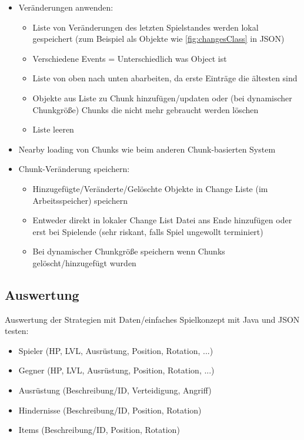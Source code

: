 \begin{itemize}
    \item Veränderungen anwenden:
    \begin{itemize}
        \item Liste von Veränderungen des letzten Spielstandes werden lokal gespeichert (zum Beispiel als Objekte wie \ref{fig:changesClass} in JSON)
        \item Verschiedene Events = Unterschiedlich was Object ist
        \item Liste von oben nach unten abarbeiten, da erste Einträge die ältesten sind 
        \item Objekte aus Liste zu Chunk hinzufügen/updaten oder (bei dynamischer Chunkgröße) Chunks die nicht mehr gebraucht werden löschen
        \item Liste leeren
    \end{itemize}
    \item Nearby loading von Chunks wie beim anderen Chunk-basierten System
    \item Chunk-Veränderung speichern:
    \begin{itemize}
        \item Hinzugefügte/Veränderte/Gelöschte Objekte in Change Liste (im Arbeitsspeicher) speichern
        \item Entweder direkt in lokaler Change List Datei ans Ende hinzufügen oder erst bei Spielende (sehr riskant, falls Spiel ungewollt terminiert)
        \item Bei dynamischer Chunkgröße speichern wenn Chunks gelöscht/hinzugefügt wurden
    \end{itemize}
\end{itemize}


\subsection{Auswertung}
Auswertung der Strategien mit Daten/einfaches Spielkonzept mit Java und JSON testen:
\begin{itemize}
    \item Spieler (HP, LVL, Ausrüstung, Position, Rotation, ...)
    \item Gegner (HP, LVL, Ausrüstung, Position, Rotation, ...)
    \item Ausrüstung (Beschreibung/ID, Verteidigung, Angriff)
    \item Hindernisse (Beschreibung/ID, Position, Rotation)
    \item Items (Beschreibung/ID, Position, Rotation)
\end{itemize}

